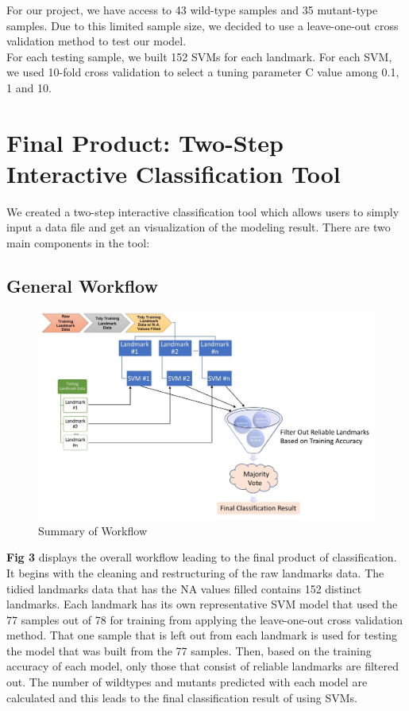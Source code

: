 \documentclass[10pt,letterpaper]{article}
\begin{document}
For our project, we have access to 43 wild-type samples and 35
mutant-type samples. Due to this limited sample size, we decided to use
a leave-one-out cross validation method to test our model.\\
For each testing sample, we built 152 SVMs for each landmark. For each
SVM, we used 10-fold cross validation to select a tuning parameter C
value among 0.1, 1 and 10.

\section{Final Product: Two-Step Interactive Classification
Tool}\label{final-product-two-step-interactive-classification-tool}

We created a two-step interactive classification tool which allows users
to simply input a data file and get an visualization of the modeling
result. There are two main components in the tool:

\subsection{General Workflow}\label{general-workflow}

\begin{figure}[htbp]
\centering
\includegraphics{figures/Figure1.jpg}
\caption{Summary of Workflow}
\end{figure}

\textbf{Fig 3} displays the overall workflow leading to the final
product of classification. It begins with the cleaning and restructuring
of the raw landmarks data. The tidied landmarks data that has the NA
values filled contains 152 distinct landmarks. Each landmark has its own
representative SVM model that used the 77 samples out of 78 for training
from applying the leave-one-out cross validation method. That one sample
that is left out from each landmark is used for testing the model that
was built from the 77 samples. Then, based on the training accuracy of
each model, only those that consist of reliable landmarks are filtered
out. The number of wildtypes and mutants predicted with each model are
calculated and this leads to the final classification result of using
SVMs.
\end{document}
